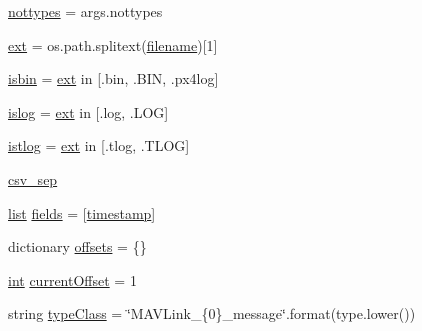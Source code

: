 \begin{DoxyCompactItemize}
\mbox{\hyperlink{namespacepymavlink_1_1tools_1_1mavlogdump_a303e0c1229846d262037f631d2356254}{nottypes}} = args.\+nottypes
\item 
\mbox{\hyperlink{namespacepymavlink_1_1tools_1_1mavlogdump_ad2aee23289790e6ed5482ef50c2c53b0}{ext}} = os.\+path.\+splitext(\mbox{\hyperlink{namespacepymavlink_1_1tools_1_1mavlogdump_a1a3af4daa72962166a120b07458a1d2d}{filename}})\mbox{[}1\mbox{]}
\item 
\mbox{\hyperlink{namespacepymavlink_1_1tools_1_1mavlogdump_af56e6708a5dbbf02ca5b3497e4fc6aab}{isbin}} = \mbox{\hyperlink{namespacepymavlink_1_1tools_1_1mavlogdump_ad2aee23289790e6ed5482ef50c2c53b0}{ext}} in \mbox{[}\textquotesingle{}.bin\textquotesingle{}, \textquotesingle{}.B\+IN\textquotesingle{}, \textquotesingle{}.px4log\textquotesingle{}\mbox{]}
\item 
\mbox{\hyperlink{namespacepymavlink_1_1tools_1_1mavlogdump_ae6ae5f3d617fddf9083caa61aa248e18}{islog}} = \mbox{\hyperlink{namespacepymavlink_1_1tools_1_1mavlogdump_ad2aee23289790e6ed5482ef50c2c53b0}{ext}} in \mbox{[}\textquotesingle{}.log\textquotesingle{}, \textquotesingle{}.L\+OG\textquotesingle{}\mbox{]}
\item 
\mbox{\hyperlink{namespacepymavlink_1_1tools_1_1mavlogdump_a3ae8fff201f063e8f0036e4cfa1c8d1f}{istlog}} = \mbox{\hyperlink{namespacepymavlink_1_1tools_1_1mavlogdump_ad2aee23289790e6ed5482ef50c2c53b0}{ext}} in \mbox{[}\textquotesingle{}.tlog\textquotesingle{}, \textquotesingle{}.T\+L\+OG\textquotesingle{}\mbox{]}
\item 
\mbox{\hyperlink{namespacepymavlink_1_1tools_1_1mavlogdump_a98d87b66146b93f20c0690e737b3cb8b}{csv\+\_\+sep}}
\item 
\mbox{\hyperlink{structlist}{list}} \mbox{\hyperlink{namespacepymavlink_1_1tools_1_1mavlogdump_a8a7ca8e476c5e470f5fff33b76b6abb0}{fields}} = \mbox{[}\textquotesingle{}\mbox{\hyperlink{namespacepymavlink_1_1tools_1_1mavlogdump_a48f60cea754ecb290fd64f00e0ed6840}{timestamp}}\textquotesingle{}\mbox{]}
\item 
dictionary \mbox{\hyperlink{namespacepymavlink_1_1tools_1_1mavlogdump_a939d06fcf84e8a17666d2f1503bc7ea5}{offsets}} = \{\}
\item 
\mbox{\hyperlink{namespacepymavlink_1_1tools_1_1mavlogdump_a2fe404e5ba17834d53138cfe0a4fd638}{int}} \mbox{\hyperlink{namespacepymavlink_1_1tools_1_1mavlogdump_a8b9296936da54456876bff3ebdea1772}{current\+Offset}} = 1
\item 
string \mbox{\hyperlink{namespacepymavlink_1_1tools_1_1mavlogdump_ac7f442d05e751559a14b0ca409556f09}{type\+Class}} = \char`\"{}M\+A\+V\+Link\+\_\+\{0\}\+\_\+message\char`\"{}.format(type.\+lower())

\end{DoxyCompactItemize}
